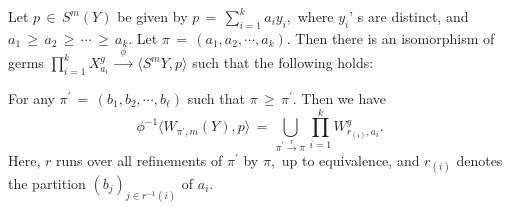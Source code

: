 \documentclass[10pt,a4paper]{amsart}
\begin{document}
\begin{lemma}\label{local structure}
    Let $ p\,\in\, S^{m}(Y)$ be given by $ p\,=\, \sum_{i=1}^{k}a_{i}y_{i},$ where $y_{i} $' s are distinct, and $ a_{1}\,\geq\, a_{2}\,\geq\, \cdots\, \geq\, a_{k}.$  Let $ \pi\,=\,(a_{1},a_{2},\cdots,a_{k})$. Then there is an isomorphism of germs 
    $\prod_{i=1}^{k} X_{a_{i}}^g\,\xrightarrow{\,\,\,\phi\,\,\,}\, \langle S^{m}Y, p \rangle$ such that the following holds:
    
    For any $\pi^{\prime}\,=\, (b_{1}, b_{2},\cdots,b_{\ell})$ such that $ \pi\, \geq\, \pi^{\prime}.$ Then we have $$ \phi^{-1}\langle W_{\pi^{\prime},m}(Y), p\rangle\, =\, \bigcup_{\pi^{\prime}\xrightarrow{r} \pi} \prod_{i=1}^{k} W_{r_{(i)},a_{i}}^{g}.$$ Here, $r$ runs over all refinements of $ \pi^{\prime}$ by $\pi,$ up to equivalence, and $r_{(i)}$ denotes the partition $ (b_{j})_{j\in r^{-1}(i)}$ of $a_i.$


\end{lemma}
\end{document}
